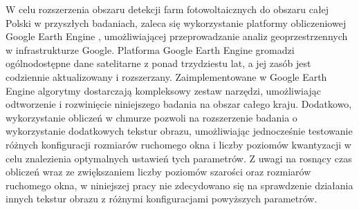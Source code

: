 \documentclass{amuthesis}
\begin{document}
W celu rozszerzenia obszaru detekcji farm fotowoltaicznych do obszaru
całej Polski w przyszłych badaniach, zaleca się wykorzystanie platformy
obliczeniowej Google Earth Engine \autocite{gorelick_2017_gee},
umożliwiającej przeprowadzanie analiz geoprzestrzennych w
infrastrukturze Google. Platforma Google Earth Engine gromadzi
ogólnodostępne dane satelitarne z ponad trzydziestu lat, a jej zasób
jest codziennie aktualizowany i rozszerzany. Zaimplementowane w Google
Earth Engine algorytmy dostarczają kompleksowy zestaw narzędzi,
umożliwiając odtworzenie i rozwinięcie niniejszego badania na obszar
całego kraju. Dodatkowo, wykorzystanie obliczeń w chmurze pozwoli na
rozszerzenie badania o wykorzystanie dodatkowych tekstur obrazu,
umożliwiając jednocześnie testowanie różnych konfiguracji rozmiarów
ruchomego okna i liczby poziomów kwantyzacji w celu znalezienia
optymalnych ustawień tych parametrów. Z uwagi na rosnący czas obliczeń
wraz ze zwiększaniem liczby poziomów szarości oraz rozmiarów ruchomego
okna, w niniejszej pracy nie zdecydowano się na sprawdzenie działania
innych tekstur obrazu z różnymi konfiguracjami powyższych parametrów.

\printbibliography[heading=bibintoc, title=Bibliografia]
\end{document}
